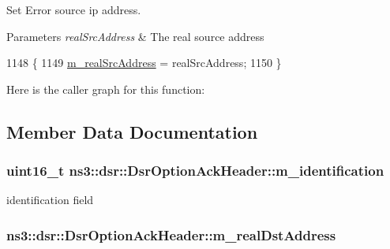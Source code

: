 Set Error source ip address. 


\begin{DoxyParams}{Parameters}
{\em real\+Src\+Address} & The real source address \\
\hline
\end{DoxyParams}

\begin{DoxyCode}
1148 \{
1149   \hyperlink{classns3_1_1dsr_1_1DsrOptionAckHeader_ad060f430901fed7d8f971049570baf75}{m\_realSrcAddress} = realSrcAddress;
1150 \}
\end{DoxyCode}


Here is the caller graph for this function\+:




\subsection{Member Data Documentation}
\subsubsection[{\texorpdfstring{m\+\_\+identification}{m_identification}}]{\setlength{\rightskip}{0pt plus 5cm}uint16\+\_\+t ns3\+::dsr\+::\+Dsr\+Option\+Ack\+Header\+::m\+\_\+identification\hspace{0.3cm}{\ttfamily [private]}}\hypertarget{classns3_1_1dsr_1_1DsrOptionAckHeader_a39abf2407ed4656d1b5f7798bd85f69a}{}\label{classns3_1_1dsr_1_1DsrOptionAckHeader_a39abf2407ed4656d1b5f7798bd85f69a}


identification field 

\subsubsection[{\texorpdfstring{m\+\_\+real\+Dst\+Address}{m_realDstAddress}}]{ ns3\+::dsr\+::\+Dsr\+Option\+Ack\+Header\+::m\+\_\+real\+Dst\+Address\hspace{0.3cm}{\ttfamily [private]}}\hypertarget{classns3_1_1dsr_1_1DsrOptionAckHeader_a624db91e7f17dfaa54d737a801166680}{}\label{classns3_1_1dsr_1_1DsrOptionAckHeader_a624db91e7f17dfaa54d737a801166680}


